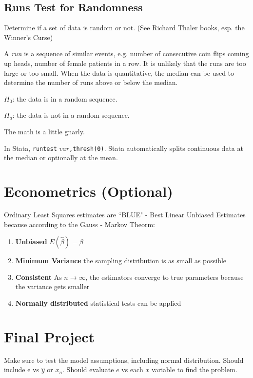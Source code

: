 \documentclass[11pt, oneside]{article}   	%
\begin{document}
\subsection{Runs Test for Randomness}

Determine if a set of data is random or not. (See Richard Thaler books, esp. the Winner's Curse)

A \textit{run} is a sequence of similar events, e.g. number of consecutive coin flips coming up heads, number of female patients in a row. It is unlikely that the runs are too large or too small. When the data is quantitative, the median can be used to determine the number of runs above or below the median.

$H_0$: the data is in a random sequence.

$H_a$: the data is not in a random sequence.

The math is a little gnarly.

In Stata, \texttt{runtest} $var$\texttt{,thresh(0)}. Stata automatically splits continuous data at the median or optionally at the mean.


\section{Econometrics (Optional)}

Ordinary Least Squares estimates are ``BLUE" - Best Linear Unbiased Estimates because according to the Gauss - Markov Theorm:
\begin{enumerate}
\item{ \textbf{Unbiased} $E(\hat{\beta}) = \beta$}

\item{ \textbf{Minimum Variance} the sampling distribution is as small as possible}

\item{ \textbf{Consistent} As $n \rightarrow \infty$, the estimators converge to true parameters because the variance gets smaller}

\item{ \textbf{Normally distributed} statistical tests can be applied}

\end{enumerate}


\section{Final Project}

Make sure to test the model assumptions, including normal distribution. Should include e vs $\hat{y}$ or $x_n$. Should evaluate $e$ vs each $x$ variable to find the problem.
\end{document}
